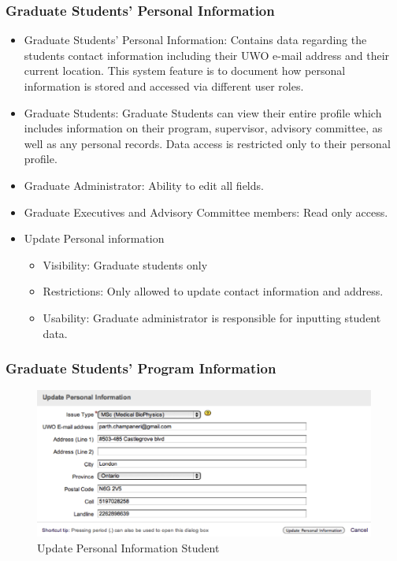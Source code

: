 \documentclass[11pt,a4paper]{report}
\begin{document}
\subsubsection{Graduate Students' Personal Information}
\begin{itemize}
\item Graduate Students' Personal Information:
Contains data regarding the students contact information including their UWO e-mail address and their current location. This system feature is to document how personal information is stored and accessed via different user roles. 
\item Graduate Students: Graduate Students can view their entire profile which includes information on their program, supervisor, advisory committee, as well as any personal records. Data access is restricted only to their personal profile.
\item Graduate Administrator: Ability to edit all fields.
\item Graduate Executives and Advisory Committee members: Read only access.
\item Update Personal information
\begin{itemize}
\item Visibility: Graduate students only
\item Restrictions: Only allowed to update contact information and address. 
\item Usability: Graduate administrator is responsible for inputting student data.
\end{itemize}
\end{itemize}
\subsubsection{Graduate Students’ Program Information}

\begin{figure}[htp]
\centering
\includegraphics[scale=1]{diagrams/HTMLTemplating/UpdatePersonalInfoStudent.png}
\caption{Update Personal Information Student}
\label{fig:UpdatePIS}
\end{figure}
\end{document}
